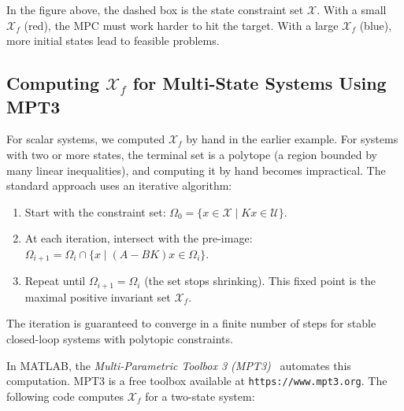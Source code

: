 In the figure above, the dashed box is the state constraint set $\mathcal{X}$. With a small $\mathcal{X}_f$ (red), the MPC must work harder to hit the target. With a large $\mathcal{X}_f$ (blue), more initial states lead to feasible problems.

\subsection{Computing $\mathcal{X}_f$ for Multi-State Systems Using MPT3}

For scalar systems, we computed $\mathcal{X}_f$ by hand in the earlier example. For systems with two or more states, the terminal set is a polytope (a region bounded by many linear inequalities), and computing it by hand becomes impractical. The standard approach uses an iterative algorithm:

\begin{enumerate}
	\item Start with the constraint set: $\Omega_0 = \{x \in \mathcal{X} \mid Kx \in \mathcal{U}\}$.
	\item At each iteration, intersect with the pre-image: $\Omega_{i+1} = \Omega_i \cap \{x \mid (A-BK)x \in \Omega_i\}$.
	\item Repeat until $\Omega_{i+1} = \Omega_i$ (the set stops shrinking). This fixed point is the maximal positive invariant set $\mathcal{X}_f$.
\end{enumerate}

The iteration is guaranteed to converge in a finite number of steps for stable closed-loop systems with polytopic constraints.

In MATLAB, the \emph{Multi-Parametric Toolbox 3 (MPT3)}~\cite{Herceg2013} automates this computation. MPT3 is a free toolbox available at \texttt{https://www.mpt3.org}. The following code computes $\mathcal{X}_f$ for a two-state system:

